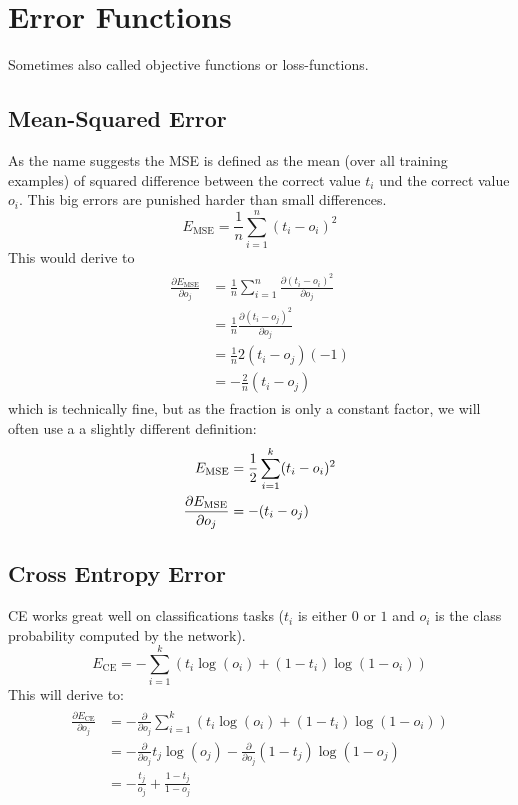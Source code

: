 \section{Error Functions}
Sometimes also called objective functions or loss-functions.

\subsection{Mean-Squared Error}
As the name suggests the \gls{MSE} is defined as the mean (over all training examples) of squared difference between the correct value $t_i$ und the correct value $o_i$. This big errors are punished harder than small differences.
\begin{equation}\label{eq:mse}
E_{\text{MSE}} = \frac{1}{n} \sum_{i=1}^n (t_i - o_i)^2
\end{equation}
This would derive to
\begin{align}
\begin{split}
\frac{\partial E_{\text{MSE}}}{\partial o_j}
&= \frac{1}{n} \sum_{i=1}^n \frac{\partial (t_i - o_i)^2}{\partial o_j}\\
&= \frac{1}{n} \frac{\partial (t_i - o_j)^2}{\partial o_j}\\
&= \frac{1}{n} 2 (t_i - o_j) (-1)\\
&= - \frac{2}{n} (t_i - o_j)
\end{split}
\end{align}
which is technically fine, but as the fraction is only a constant factor, we will often use a a slightly different definition:
\begin{align}\label{ed:mse2}
E_{\text{MSE}} &= \frac{1}{2} \sum_{i=1}^k (t_i - o_i)^2\\
\frac{\partial E_{\text{MSE}}}{\partial o_j}
&= - (t_i - o_j)
\end{align}

\subsection{Cross Entropy Error}
\Gls{CE} works great well on classifications tasks ($t_i$ is either $0$ or $1$ and $o_i$ is the class probability computed by the network).
\begin{equation}\label{eq:ce}
E_{\text{CE}} = - \sum_{i=1}^k \left( t_i \log(o_i) + (1 - t_i) \log(1 - o_i) \right)
\end{equation}
This will derive to:
\begin{align}
\begin{split}
\frac{\partial E_{\text{CE}}}{\partial o_j} &= - \frac{\partial}{\partial o_j} \sum_{i=1}^k \left( t_i \log(o_i) + (1 - t_i) \log(1 - o_i) \right)\\
&= - \frac{\partial}{\partial o_j} t_j \log(o_j) - \frac{\partial}{\partial o_j} (1 - t_j) \log(1 - o_j)\\
&= - \frac{t_j}{o_j} + \frac{1 - t_j}{1 - o_j}
\end{split}
\end{align}